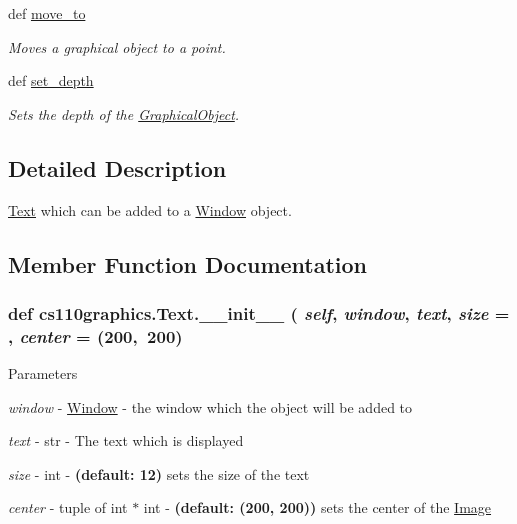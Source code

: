 \begin{DoxyCompactItemize}
def \hyperlink{classcs110graphics_1_1GraphicalObject_abe2d480265df7ac9447205c52c6946df}{move\_\-to}
\begin{DoxyCompactList}\small\item\em Moves a graphical object to a point. \item\end{DoxyCompactList}\item 
def \hyperlink{classcs110graphics_1_1GraphicalObject_a20d76d4ee4419c3065d61deb6cbc6700}{set\_\-depth}
\begin{DoxyCompactList}\small\item\em Sets the depth of the \hyperlink{classcs110graphics_1_1GraphicalObject}{GraphicalObject}. \item\end{DoxyCompactList}\end{DoxyCompactItemize}


\subsection{Detailed Description}
\hyperlink{classcs110graphics_1_1Text}{Text} which can be added to a \hyperlink{classcs110graphics_1_1Window}{Window} object. 

\subsection{Member Function Documentation}
\hypertarget{classcs110graphics_1_1Text_a022ce78a2945edbd8dfe3c4498769a62}{
\subsubsection[{\_\-\_\-init\_\-\_\-}]{\setlength{\rightskip}{0pt plus 5cm}def cs110graphics.Text.\_\-\_\-init\_\-\_\- ( {\em self}, \/   {\em window}, \/   {\em text}, \/   {\em size} = {}, \/   {\em center} = {\ttfamily (200,~200})}}
\label{classcs110graphics_1_1Text_a022ce78a2945edbd8dfe3c4498769a62}

\begin{DoxyParams}{Parameters}
\item[{\em window}]-\/ \hyperlink{classcs110graphics_1_1Window}{Window} -\/ the window which the object will be added to \item[{\em text}]-\/ str -\/ The text which is displayed \item[{\em size}]-\/ int -\/ {\bfseries (default: 12)} sets the size of the text \item[{\em center}]-\/ tuple of int $\ast$ int -\/ {\bfseries (default: (200, 200))} sets the center of the \hyperlink{classcs110graphics_1_1Image}{Image} \end{DoxyParams}


